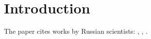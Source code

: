 \documentclass[a4paper,12pt]{article}
\begin{document}
\section*{Introduction}

The paper cites works by Russian scientists: 
\textcite{Ivanov2020}, \textcite{Petrov2021}, \textcite{Sidorov2019}.

\printbibliography
\end{document}
